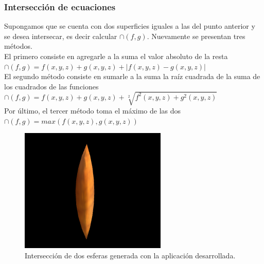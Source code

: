 \documentclass[12pt]{article}
\begin{document}
\subsubsection{Intersección de ecuaciones}
Supongamos que se cuenta con dos superficies iguales a las del punto anterior y se desea intersecar, es decir calcular $\cap(f,g)$. Nuevamente se presentan tres métodos.
\\El primero consiste en agregarle a la suma el valor absoluto de la resta  $\cap(f,g)= f(x,y,z) + g(x,y,z)+ |f(x,y,z) - g(x,y,z)|$ 
\\El segundo método consiste en sumarle a la suma la raíz cuadrada de la suma de los cuadrados de las funciones   $\cap(f,g)= f(x,y,z) + g(x,y,z)+ \sqrt[2]{f^2(x,y,z) +g^2(x,y,z)}$ 
\\Por último, el tercer método toma el máximo de las dos   $\cap(f,g)= max(f(x,y,z) , g(x,y,z))$
\clearpage
\begin{figure}[h]
\includegraphics[width=\linewidth,center]{oi2.png}
\caption{Intersección de dos esferas generada con la aplicación desarrollada.}
\end{figure}
\end{document}
